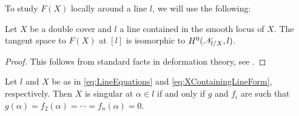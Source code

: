 To study $F(X)$ locally around a line $l$, we will use the following:
\begin{proposition}
  \label{prop:FanoSchemeTangent}
  Let $X$ be a double cover and $l$ a line contained in the smooth locus of $X$. The tangent space to $F(X)$ at $[l]$ is isomorphic to $H^0(\mathscr{N}_{l/X},l)$.
\end{proposition}
\begin{proof}
  This follows from standard facts in deformation theory, see \eg \cite[Theorem 4.3.5]{SernesiDeformation}.
\end{proof}

\begin{lemma}
  \label{lem:SingularConditionLineForm}
  Let $l$ and $X$ be as in \eqref{eq:LineEquations} and \eqref{eq:XContainingLineForm}, respectively. Then $X$ is singular at $\alpha \in l$ if and only if $g$ and $f_i$ are such that $g(\alpha)=f_2(\alpha)=\cdots = f_n(\alpha) = 0$. \end{lemma}
